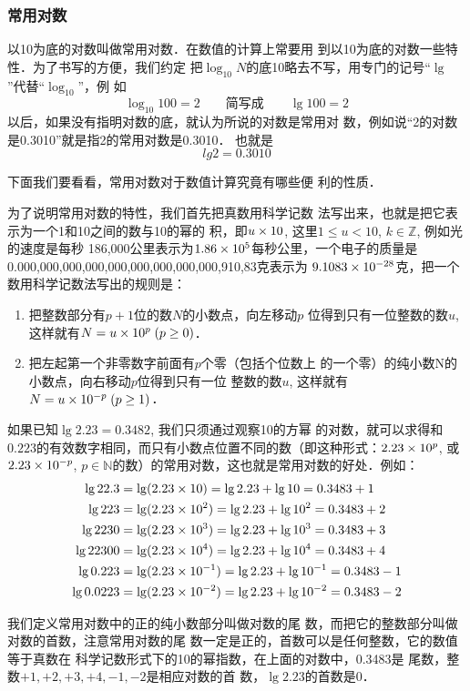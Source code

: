 \subsubsection{常用对数}
    以10为底的对数叫做常用对数．在数值的计算上常要用
    到以10为底的对数一些特性．为了书写的方便，我们约定
    把$\log_{10}N$的底10略去不写，用专门的记号“$\lg$”代替“$\log_{10}$”，例
    如
\[ \log_{10} 100=2 \qquad \text{简写成}\qquad  \lg100=2\]
    以后，如果没有指明对数的底，就认为所说的对数是常用对
    数，例如说“2的对数是0.3010”就是指2的常用对数是0.3010．
    也就是
 \[   lg2=0.3010\]
  
 下面我们要看看，常用对数对于数值计算究竟有哪些便
    利的性质．

为了说明常用对数的特性，我们首先把真数用科学记数
法写出来，也就是把它表示为一个1和10之间的数与10的幂的
积，即$u\times10$, 这里$1\le u<10$, $k\in\mathbb{Z}$, 例如光的速度是每秒
186,000公里表示为$1.86\times10^5$每秒公里，一个电子的质量是
0.000,000,000,000,000,000,000,000,000,910,83克表示为
$9.1083\times10^{-28}$克，把一个数用科学记数法写出的规则是：

\begin{enumerate}
    \item 把整数部分有$p+1$位的数$N$的小数点，向左移动$p$
    位得到只有一位整数的数$u$, 这样就有$N=u\times10^p\; (p\ge0)$．
    \item 把左起第一个非零数字前面有$p$个零（包括个位数上
    的一个零）的纯小数N的小数点，向右移动$p$位得到只有一位
    整数的数$u$, 这样就有$N=u\times10^{-p}\; (p\ge1)$．
\end{enumerate}

如果已知$\lg2.23=0.3482$, 我们只须通过观察10的方幂
    的对数，就可以求得和$0.223$的有效数字相同，而只有小数点位置不同的数（即这种形式：$2.23\times10^p$, 或$2.23\times10^{-p}$,
    $p\in\mathbb{N}$的数）的常用对数，这也就是常用对数的好处．例如：
\[\begin{split}
\lg22.3&=\lg(2.23\times 10)=\lg2.23+\lg 10=0.3483+1\\
\lg223&=\lg(2.23\times 10^2)=\lg2.23+\lg 10^2=0.3483+2\\
\lg2230&=\lg(2.23\times 10^3)=\lg2.23+\lg 10^3=0.3483+3\\
\lg22300&=\lg(2.23\times 10^4)=\lg2.23+\lg 10^4=0.3483+4\\
\lg0.223&=\lg(2.23\times 10^{-1})=\lg2.23+\lg 10^{-1}=0.3483-1\\
\lg0.0223&=\lg(2.23\times 10^{-2})=\lg2.23+\lg 10^{-2}=0.3483-2
\end{split}\]

我们定义常用对数中的正的纯小数部分叫做对数的尾
数，而把它的整数部分叫做对数的首数，注意常用对数的尾
数一定是正的，首数可以是任何整数，它的数值等于真数在
科学记数形式下的10的幂指数，在上面的对数中，0.3483是
尾数，整数$+1,+2,+3,+4,-1,-2$是相应对数的首
数，$\lg2.23$的首数是0．

